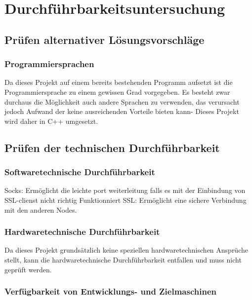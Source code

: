 \documentclass[a4paper,12pt]{scrreprt}
\begin{document}
\chapter{Durchf\"uhrbarkeitsuntersuchung}
	
	\section{Pr\"ufen alternativer L\"osungsvorschl\"age}
	
		\subsection{Programmiersprachen}
		
	Da dieses Projekt auf einem bereits bestehenden Programm aufsetzt ist die Programmiersprache zu einem gewissen Grad vorgegeben. Es besteht zwar durchaus die Möglichkeit auch andere Sprachen zu verwenden, das verursacht jedoch Aufwand der keine ausreichenden Vorteile bieten kann-
	Dieses Projekt wird daher in C++ umgesetzt.
	
		
		
		
			
	\section{Pr\"ufen der technischen Durchf\"uhrbarkeit}
		
		\subsection{Softwaretechnische Durchf\"uhrbarkeit}
		Socks: Ermöglicht die leichte port weiterleitung falls es mit der Einbindung von SSL-clienst nicht richtig Funktionniert
		SSL: Ermöglicht eine sichere Verbindung mit den anderen Nodes.
		
			
		\subsection{Hardwaretechnische Durchf\"uhrbarkeit}
			
		Da dieses Projekt grundsätzlich keine speziellen hardwaretechnischen Ansprüche stellt, 
		kann die hardwaretechnische Durchführbarkeit entfallen und muss nicht geprüft werden.
		
			
		\subsection{Verfügbarkeit von Entwicklungs- und Zielmaschinen}
			
\end{document}
